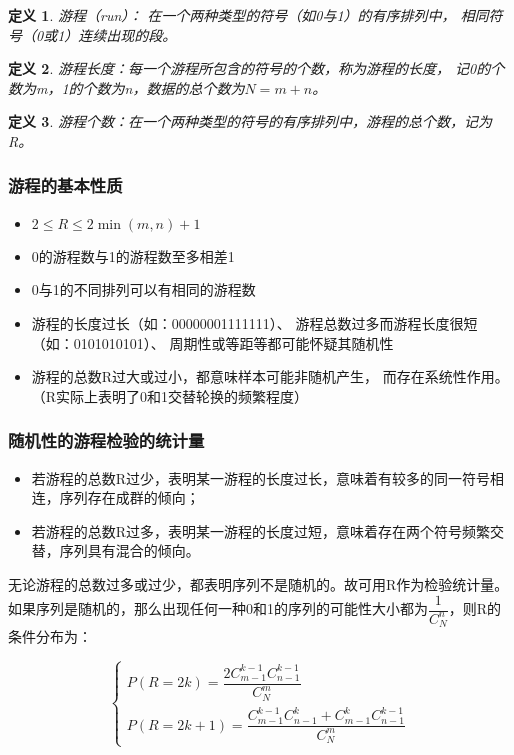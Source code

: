 \documentclass[UTF8]{ctexart}
\numberwithin{equation}{section}
\newtheorem{definition}{定义}[section]
\begin{document}
\begin{definition}
    游程（run）：
    在一个两种类型的符号（如0与1）的有序排列中，
    相同符号（0或1）连续出现的段。
\end{definition}

\begin{definition}
    游程长度：每一个游程所包含的符号的个数，称为游程的长度，
    记0的个数为m，1的个数为n，数据的总个数为$N=m+n$。
\end{definition}

\begin{definition}
    游程个数：在一个两种类型的符号的有序排列中，游程的总个数，记为R。
\end{definition}

\subsubsection{游程的基本性质}
\begin{itemize}
    \item $2 \leq R \leq 2 \min{(m,n)} + 1$
    \item 0的游程数与1的游程数至多相差1
    \item 0与1的不同排列可以有相同的游程数
    \item 游程的长度过长（如：00000001111111）、
    游程总数过多而游程长度很短（如：0101010101）、
    周期性或等距等都可能怀疑其随机性
    \item 游程的总数R过大或过小，都意味样本可能非随机产生，
    而存在系统性作用。（R实际上表明了0和1交替轮换的频繁程度）
\end{itemize}

\subsubsection{随机性的游程检验的统计量}
\begin{itemize}
    \item 若游程的总数R过少，表明某一游程的长度过长，意味着有较多的同一符号相连，序列存在成群的倾向；
    \item 若游程的总数R过多，表明某一游程的长度过短，意味着存在两个符号频繁交替，序列具有混合的倾向。    
\end{itemize}

无论游程的总数过多或过少，都表明序列不是随机的。故可用R作为检验统计量。
如果序列是随机的，那么出现任何一种0和1的序列的可能性大小都为$\dfrac{1}{C_N^n}$，则R的条件分布为：

\begin{equation}
    \begin{cases}
        P(R = 2k) = \dfrac{2C_{m-1}^{k-1}C_{n-1}^{k-1}}{C_{N}^{m}} \\[1em]
        P(R = 2k + 1) = \dfrac{C_{m-1}^{k-1}C_{n-1}^{k} + C_{m-1}^{k}C_{n-1}^{k-1}}{C_{N}^{m}}
    \end{cases}
    \nonumber
\end{equation}
\end{document}
